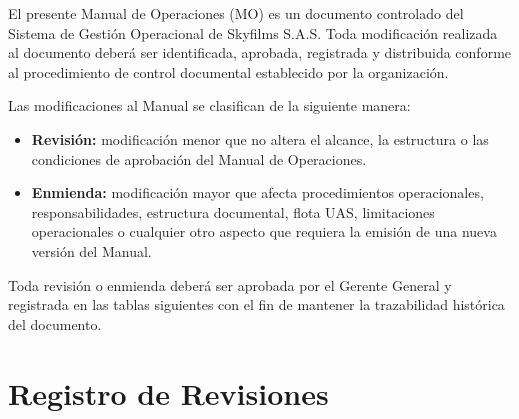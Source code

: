 

El presente Manual de Operaciones (MO) es un documento controlado del Sistema de Gestión Operacional de Skyfilms S.A.S. Toda modificación realizada al documento deberá ser identificada, aprobada, registrada y distribuida conforme al procedimiento de control documental establecido por la organización.

Las modificaciones al Manual se clasifican de la siguiente manera:

\begin{itemize}
    \item \textbf{Revisión:} modificación menor que no altera el alcance, la estructura o las condiciones de aprobación del Manual de Operaciones.
    
    \item \textbf{Enmienda:} modificación mayor que afecta procedimientos operacionales, responsabilidades, estructura documental, flota UAS, limitaciones operacionales o cualquier otro aspecto que requiera la emisión de una nueva versión del Manual.
\end{itemize}

Toda revisión o enmienda deberá ser aprobada por el Gerente General y registrada en las tablas siguientes con el fin de mantener la trazabilidad histórica del documento.

\vspace{0.7cm}


\section*{Registro de Revisiones}

\renewcommand{\arraystretch}{1.35}


